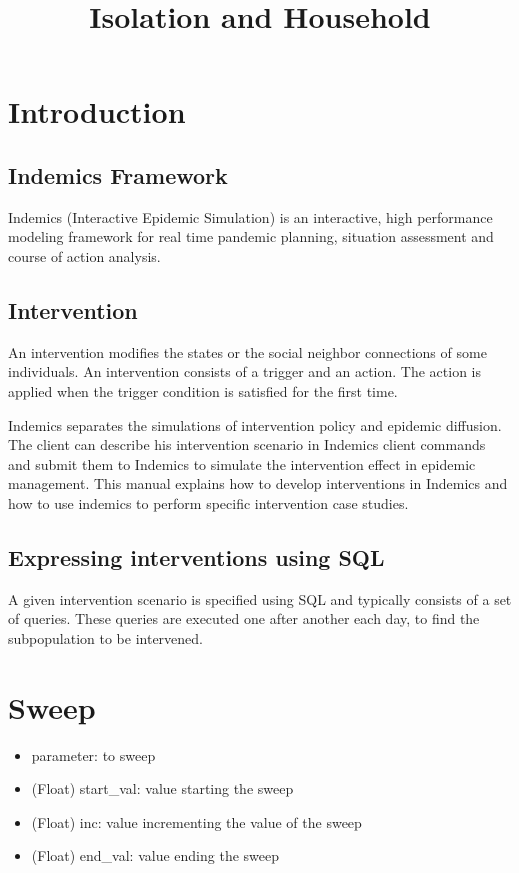 \documentclass[11pt]{article}
\title{\bf Isolation and Household}
\author{}
\date{}
\begin{document}
\maketitle

\section{Introduction}
\subsection{Indemics Framework}
Indemics (Interactive Epidemic Simulation) is an interactive, high performance modeling  framework for real time pandemic planning, situation assessment and course of action analysis. 

\subsection{Intervention}
An intervention modifies the states or the social neighbor connections of some individuals. An intervention consists of a trigger and an action. The action is applied when the trigger condition is satisfied for the first time. 

Indemics separates the simulations of intervention policy and epidemic diffusion. The client can describe his intervention scenario in Indemics client commands and submit them to Indemics to simulate the intervention effect in epidemic management. This manual explains how to develop interventions in Indemics and how to use indemics to perform specific intervention case studies.

\subsection{Expressing interventions using SQL}
A given intervention scenario is specified using SQL and typically consists of a set of queries. These queries are executed one after another each day, to find the subpopulation to be intervened. 

\section{Sweep}
\begin{itemize}
\item parameter: to sweep
\item (Float) start\_val: value starting the sweep
\item (Float) inc: value incrementing the value of the sweep
\item (Float) end\_val: value ending the sweep
\end{itemize}
\end{document}
